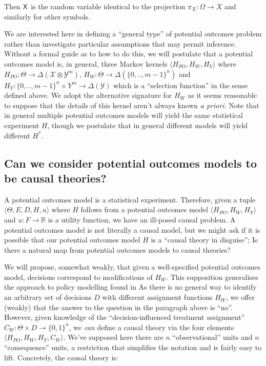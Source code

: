 Then $\mathsf{X}$ is the random variable identical to the projection $\pi_X:\Omega\to X$ and similarly for other symbols.

We are interested here in defining a ``general type'' of potential outcomes problem rather than investigate particular assumptions that may permit inference. Without a formal guide as to how to do this, we will postulate that a potential outcomes model is, in general, three Markov kernels $\langle H_{PO}, H_W, H_Y \rangle$ where $H_{PO}:\Theta\to \Delta(\mathcal{X}\otimes\mathcal{Y}^m)$, $H_W:\Theta\to \Delta(\{0,..,m-1\}^n)$ and $H_Y:\{0,..,m-1\}^n\times Y^m\to \Delta(\mathcal{Y})$ which is a ``selection function'' in the sense defined above. We adopt the alternative signature for $H_W$ as it seems reasonable to suppose that the details of this kernel aren't always known \emph{a priori}. Note that in general multiple potential outcomes models will yield the same statistical experiment $H$, though we postulate that in general different models will yield different $H^*$.

\subsection{Can we consider potential outcomes models to be causal theories?}

A potential outcomes model is a statistical experiment. Therefore, given a tuple $\langle \Theta, E, D, H, u\rangle$ where $H$ follows from a potential outcomes model $\langle H_{PO}, H_W, H_Y \rangle$ and $u:F\to \mathbb{R}$ is a utility function, we have an ill-posed causal problem. A potential outcomes model is not literally a causal model, but we might ask if it is possible that our potential outcomes model $H$ is a ``causal theory in disguise''; Is there a natural map from potential outcomes models to causal theories?

We will propose, somewhat weakly, that given a well-specified potential outcomes model, decisions correspond to modifications of $H_W$. This supposition generalises the approach to policy modelling found in \cite{heckman_policy-relevant_2001.} As there is no general way to identify an arbitrary set of decisions $D$ with different assignment functions $H_W$, we offer (weakly) that the answer to the question in the paragraph above is ``no''. However, given knowledge of the ``decision-influenced treatment assignment'' $C_W:\Theta\times D\to \{0,1\}^n$, we \emph{can} define a causal theory via the four elements $\langle H_{PO}, H_W, H_Y, C_W\rangle$. We've supposed here there are $n$ ``observational'' units and $n$ ``consequence'' units, a restriction that simplifies the notation and is fairly easy to lift. Concretely, the causal theory is:

